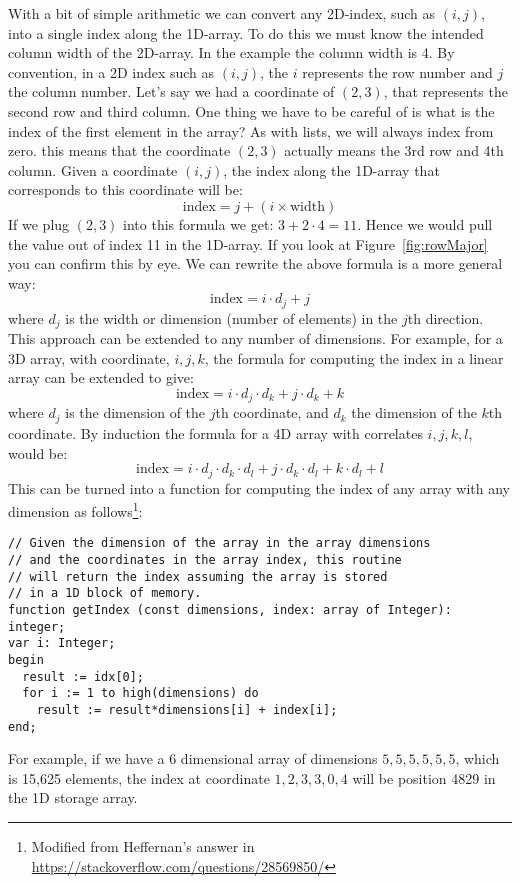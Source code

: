 With a bit of simple arithmetic we can convert any 2D-index, such as $(i, j)$, into a single index along the 1D-array. To do this we must know the intended column width of the 2D-array. In the example the column width is 4. By convention, in a 2D index such as $(i, j)$, the $i$ represents the row number and $j$ the column number. Let's say we had a coordinate of $(2,3)$, that represents the second row and third column. One thing we have to be careful of is what is the index of the first element in the array? As with lists, we will always index from zero. this means that the coordinate $(2,3)$ actually means the 3rd row and 4th column. Given a coordinate $(i,j)$, the index along the 1D-array that corresponds to this coordinate will be:
%
$$ \mbox{index} = j + (i \times \mbox{width}) $$
%
If we plug $(2,3)$ into this formula we get: $3 + 2 \cdot 4 = 11$. Hence we would pull the value out of index 11 in the 1D-array. If you look at Figure~\ref{fig:rowMajor} you can confirm this by eye. We can rewrite the above formula is a more general way:
%
$$ \mbox{index} = i \cdot d_j + j $$
%
where $d_j$ is the width or dimension (number of elements) in the $j$th direction. This approach can be extended to any number of dimensions. For example, for a 3D array, with coordinate, $i, j, k$, the formula for computing the index in a linear array can be extended to give:
%
$$ \mbox{index} = i \cdot d_j \cdot d_k + j \cdot d_k + k $$
%
where $d_j$ is the dimension of the $j$th coordinate, and $d_k$ the dimension of the $k$th coordinate. By induction the formula for a 4D array with correlates $i, j, k, l$, would be:
%
$$ \mbox{index} = i \cdot d_j \cdot d_k \cdot d_l + j \cdot d_k \cdot d_l + k \cdot d_l + l $$
%
This can be turned into a function for computing the index of any array with any dimension as follows\footnote{Modified from Heffernan's answer in \url{https://stackoverflow.com/questions/28569850/}}:
%

\begin{lstlisting}
// Given the dimension of the array in the array dimensions
// and the coordinates in the array index, this routine
// will return the index assuming the array is stored
// in a 1D block of memory.
function getIndex (const dimensions, index: array of Integer): integer;
var i: Integer;
begin
  result := idx[0];
  for i := 1 to high(dimensions) do
    result := result*dimensions[i] + index[i];
end;
\end{lstlisting}

For example, if we have a 6 dimensional array of dimensions $5,5,5,5,5,5$, which is 15,625 elements, the index at coordinate $1,2,3,3,0,4$ will be position 4829 in the 1D storage array.


